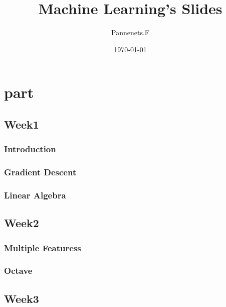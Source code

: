 \documentclass[en,11pt,english,black,simple,device=ppt]{elegantbook}
\title{Machine Learning's Slides}
\author{Pannenets.F}
\date{\today}
\begin{document}
\maketitle
\frontmatter

\tableofcontents

\mainmatter

\part{part}

\chapter{Week1}

\section{Introduction}




\section{Gradient Descent}




\section{Linear Algebra}




\chapter{Week2}

\section{Multiple Featuress}




\section{Octave}




\chapter{Week3}
\end{document}
